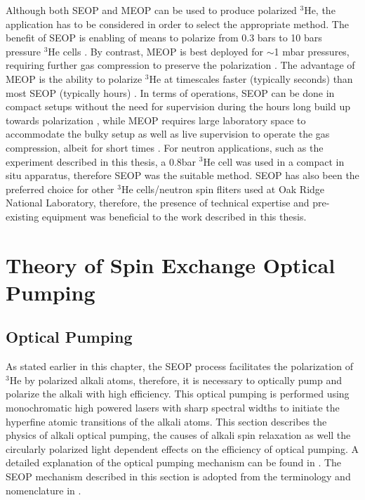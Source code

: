 Although both SEOP and MEOP can be used to produce polarized $^3$He, the application has to be considered in order to select the appropriate method. The benefit of SEOP is enabling of means to polarize from 0.3 bars to 10 bars pressure $^3$He cells \cite{Gentile2017}. By contrast, MEOP is best deployed for $\sim$1 mbar pressures, requiring further gas compression to preserve the polarization \cite{Gentile2017}. The advantage of MEOP is the ability to polarize $^3$He at timescales faster (typically seconds) than most SEOP (typically hours) \cite{Gentile2017}.  In terms of operations, SEOP can be done in compact setups without the need for supervision during the hours long build up towards polarization \cite{Jiang2013}, while MEOP requires large laboratory space to accommodate the bulky setup as well as live supervision to operate the gas compression, albeit for short times \cite{Batz2011}. For neutron applications, such as the experiment described in this thesis, a 0.8bar $^3$He cell was used in a compact in situ apparatus, therefore SEOP was the suitable method. SEOP has also been the preferred choice for other $^3$He cells/neutron spin fliters used at Oak Ridge National Laboratory, therefore, the presence of technical expertise and pre-existing equipment was beneficial to the work described in this thesis. 

\section{Theory of Spin Exchange Optical Pumping}

\subsection{Optical Pumping}

As stated earlier in this chapter, the SEOP process facilitates the polarization of $^3$He by polarized alkali atoms, therefore, it is necessary to optically pump and polarize the alkali with high efficiency. This optical pumping is performed using monochromatic high powered lasers with sharp spectral widths to initiate the hyperfine atomic transitions of the alkali atoms. This section describes the physics of alkali optical pumping, the causes of alkali spin relaxation as well the circularly polarized light dependent effects on the efficiency of optical pumping. A detailed explanation of the optical pumping mechanism can be found in \cite{Gentile2017, Happer1987, Walker2011}. The SEOP mechanism described in this section is adopted from the terminology and nomenclature in \cite{Gentile2017}.

